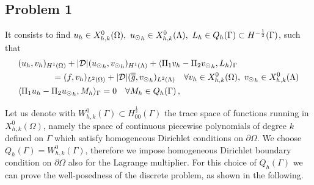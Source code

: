 \subsection{Problem 1}It consists to find $u_h \in X_{h,k}^0 (\Omega) ,\ {u_{\odot}}_h \in X_{h,k}^0(\Lambda) , \ L_h \in Q_h(\Gamma) \subset H^{-\frac12}(\Gamma )$, such that
\begin{subequations}
\begin{align}
&(u_h,v_h)_{H^1(\Omega)} + |{\cal D}| ({\ud}_h,{\vd}_h)_{H^1(\Lambda)} 
+ \langle \Pi_1 v_h  - \Pi_2 {\vd}_h, L_h \rangle_\Gamma 
\\
\nonumber
&\qquad\qquad= (f,v_h)_{L^2(\Omega)} + |{\cal D}|(\avrd{g},{\vd}_h)_{L^2(\Lambda)}
\quad \forall v_h \in X_{h,k}^0(\Omega), \ {\vd}_h \in X_{h,k}^0(\Lambda)
\\
&   \langle \Pi_1 u_h - \Pi_2 {\ud}_h , M_h \rangle_\Gamma = 0
\quad \forall M_h \in Q_h(\Gamma)\,,
\end{align}
\end{subequations}

Let us denote with $W_{h,k}^0(\Gamma) \subset H^{\frac 12}_{00}(\Gamma)$ the trace space of functions running in $X_{h,k}^0(\Omega)$, namely the space of continuous piecewise polynomials of degree $k$ defined on $\Gamma$ which satisfy homogeneous Dirichlet conditions on $\partial \Omega$. We choose $Q_h(\Gamma)=W_{h,k}^0(\Gamma)$, therefore we impose homogeneous Dirichlet boundary condition on $\partial \Omega$ also for the Lagrange multiplier. For this choice of $Q_h(\Gamma)$ we can prove the well-posedness of the discrete problem, as shown in the following. 

